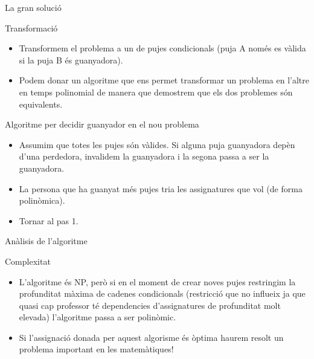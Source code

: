 \documentclass[twocolumn]{beamer}
\begin{document}
\begin{frame}{La gran solució}
\begin{block}{Transformació}
	\begin{itemize}
		\item Transformem el problema a un de pujes condicionals (puja A només es vàlida si la puja B és guanyadora).
		\item Podem donar un algoritme que ens permet transformar un problema en l'altre en temps polinomial de manera que demostrem que els dos problemes són equivalents.
	\end{itemize}
\end{block}
\begin{block}{Algoritme per decidir guanyador en el nou problema}
	\begin{itemize}
		\item Assumim que totes les pujes són vàlides. Si alguna puja guanyadora depèn d'una perdedora, invalidem la guanyadora i la segona passa a ser la guanyadora.
		\item La persona que ha guanyat més pujes tria les assignatures que vol (de forma polinòmica).
		\item Tornar al pas 1.
	\end{itemize}
\end{block}
\end{frame}

\begin{frame}{Anàlisis de l'algoritme}
\begin{block}{Complexitat}
	\begin{itemize}
		\item L'algoritme és NP, però si en el moment de crear noves pujes restringim la profunditat màxima de cadenes condicionals (restricció que no influeix ja que quasi cap professor té dependencies d'assignatures de profunditat molt elevada) l'algoritme passa a ser polinòmic.
		\item Si l'assignació donada per aquest algorisme és òptima haurem resolt un problema important en les matemàtiques!
	\end{itemize}
\end{block}
\end{frame}
\end{document}
